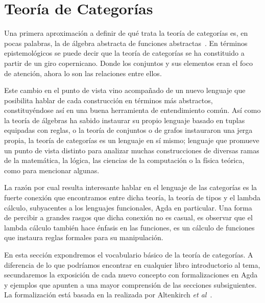 \chapter{Teor\'ia de Categor\'ias} \label{cat}

\begin{epigraphs}
\end{epigraphs}

Una primera aproximación a definir de qué trata la teoría de categorías es, en pocas palabras, la de álgebra abstracta de funciones abstractas~\cite{Awodey}. 
En términos epistemológicos se puede decir que la teoría de categorías se ha constituido a partir de un giro copernicano. Donde los conjuntos y sus elementos eran el foco de atención, ahora lo son las relaciones entre ellos.

Este cambio en el punto de vista vino acompañado de un nuevo lenguaje que posibilita hablar de cada construcción en términos más abstractos, constituyéndose así en una buena herramienta de entendimiento común. 
Así como la teoría de álgebras ha sabido instaurar su propio lenguaje basado en tuplas equipadas con reglas, o la teoría de conjuntos o de grafos instauraron una jerga propia, la teoría de categorías es un lenguaje en sí mismo; lenguaje que promueve un punto de vista distinto para analizar muchas construcciones de diversas ramas de la matemática, la lógica, las ciencias de la computación o la física teórica, como para mencionar algunas.  


La razón por cual resulta interesante hablar en el lenguaje de las categorías es la fuerte conexión que encontramos entre dicha teoría, la teoría de tipos y el lambda cálculo, subyacentes a los lenguajes funcionales, Agda en particular. Una forma de percibir a grandes rasgos que dicha conexión no es casual, es observar que el lambda cálculo también hace énfasis en las funciones, es un cálculo de funciones que instaura reglas formales para su manipulación. 

En esta sección expondremos el vocabulario básico de la teoría de categorías. A diferencia de lo que podríamos encontrar en cualquier libro introductorio al tema, secundaremos la exposición de cada nuevo concepto con formalizaciones en Agda y ejemplos que apunten a una mayor comprensión de las secciones subsiguientes. La formalización está basada en la realizada por Altenkirch {\it et al}~\cite{relativemonads}.  
\newpage

